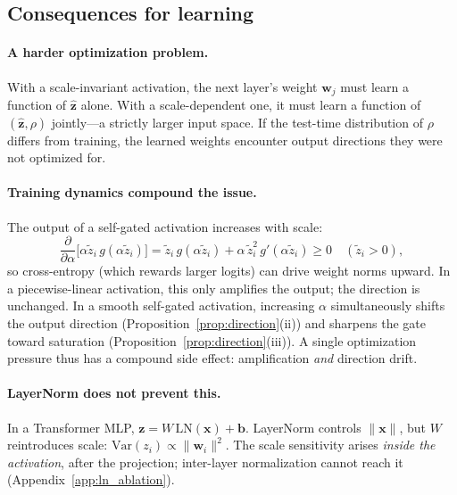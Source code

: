 \subsection{Consequences for learning}\label{sec:consequences}

\paragraph{A harder optimization problem.}
With a scale-invariant activation, the next layer's weight $\mathbf{w}_j$ must learn a function of $\hat{\mathbf{z}}$ alone.
With a scale-dependent one, it must learn a function of $(\hat{\mathbf{z}}, \rho)$ jointly---a strictly larger input space.
If the test-time distribution of $\rho$ differs from training, the learned weights encounter output directions they were not optimized for.

\paragraph{Training dynamics compound the issue.}
The output of a self-gated activation increases with scale:
\begin{equation}\label{eq:df_dalpha}
    \frac{\partial}{\partial \alpha}\bigl[\alpha \tilde{z}_i\,g(\alpha \tilde{z}_i)\bigr]
    = \tilde{z}_i\,g(\alpha \tilde{z}_i) + \alpha\,\tilde{z}_i^2\,g'(\alpha \tilde{z}_i) \geq 0 \quad (\tilde{z}_i > 0),
\end{equation}
so cross-entropy (which rewards larger logits) can drive weight norms upward.
In a piecewise-linear activation, this only amplifies the output; the direction is unchanged.
In a smooth self-gated activation, increasing $\alpha$ simultaneously shifts the output direction (Proposition~\ref{prop:direction}(ii)) and sharpens the gate toward saturation (Proposition~\ref{prop:direction}(iii)).
A single optimization pressure thus has a compound side effect: amplification \emph{and} direction drift.

\paragraph{LayerNorm does not prevent this.}
In a Transformer MLP, $\mathbf{z} = W\,\mathrm{LN}(\mathbf{x}) + \mathbf{b}$.
LayerNorm controls $\|\mathbf{x}\|$, but $W$ reintroduces scale: $\mathrm{Var}(z_i) \propto \|\mathbf{w}_i\|^2$.
The scale sensitivity arises \emph{inside the activation}, after the projection; inter-layer normalization cannot reach it (Appendix~\ref{app:ln_ablation}).